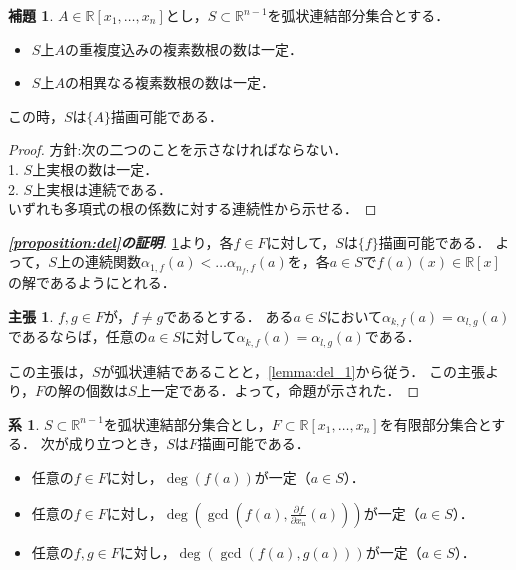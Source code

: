 \documentclass[uplatex, dvipdfmx]{jsarticle}
\newcommand{\R}{\mathbb{R}}
\theoremstyle{definition}
\newtheorem{lemma}{補題}[section]
\newtheorem{corollary}{系}[section]
\newtheorem*{claim*}{主張}
\begin{document}
\begin{lemma}\label{lemma:del_2}
$A \in \R[x_1, \dots, x_n]$とし，$S \subset \R^{n-1}$を弧状連結部分集合とする．
\begin{itemize}
\item $S$上$A$の重複度込みの複素数根の数は一定．
\item $S$上$A$の相異なる複素数根の数は一定．
\end{itemize}
この時，$S$は$\{A\}$描画可能である．
\end{lemma}

\begin{proof}
方針:次の二つのことを示さなければならない．\\
1.  $S$上実根の数は一定．\\
2.  $S$上実根は連続である．\\
いずれも多項式の根の係数に対する連続性から示せる．
\end{proof}

\begin{proof}[{\bf \cref{proposition:del}の証明}]
\cref{lemma:del_2}より，各$f \in F$に対して，$S$は$\{f\}$描画可能である．
よって，$S$上の連続関数$\alpha_{1,f}(a) < \dots \alpha_{n_f, f}(a)$を，各$a \in S$で$f(a)(x) \in \R[x]$の解であるようにとれる．

\begin{claim*}
$f, g \in F$が，$f \neq g$であるとする．
ある$a \in S$において$\alpha_{k,f}(a) = \alpha_{l,g}(a)$であるならば，任意の$a \in S$に対して$\alpha_{k,f}(a) = \alpha_{l,g}(a)$である．
\end{claim*}

この主張は，$S$が弧状連結であることと，\cref{lemma:del_1}から従う．
この主張より，$F$の解の個数は$S$上一定である．よって，命題が示された．
\end{proof}

\begin{corollary}\label{corollary:del}
$S \subset \R^{n-1}$を弧状連結部分集合とし，$F \subset \R[x_1,\dots, x_n]$を有限部分集合とする．
次が成り立つとき，$S$は$F$描画可能である．
\begin{itemize}
\item 任意の$f \in F$に対し，$\deg(f(a))$が一定（$a \in S$）．
\item 任意の$f \in F$に対し，$\deg(\gcd(f(a), \frac{\partial f}{\partial x_n}(a)))$が一定（$a \in S$）．
\item 任意の$f, g \in F$に対し，$\deg(\gcd(f(a), g(a)))$が一定（$a \in S$）．
\end{itemize}
\end{corollary}
\end{document}
